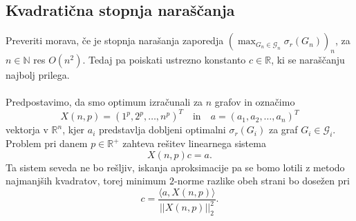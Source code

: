 \documentclass[ letterpaper, titlepage, fleqn]{article}
\begin{document}
\subsection{Kvadratična stopnja naraščanja}
Preveriti morava, če je stopnja narašanja zaporedja
$(\max_{G_n \in \mathscr{G}_n} \sigma_r(G_n))_n$, za $n \in \mathbb{N}$
res $O(n^2)$. Tedaj pa poiskati ustrezno konstanto $c \in \mathbb{R}$, ki 
se naraščanju najbolj prilega.
\\\\
Predpostavimo, da smo optimum izračunali za $n$ grafov in označimo 
$$X(n, p) = (1^p, 2^p, \dots, n^p)^T \quad \text{in}\quad a = (a_1, a_2, \dots, a_n)^T$$
vektorja v $\mathbb{R}^{n}$, kjer $a_i$ predstavlja
dobljeni optimalni $\sigma_r(G_i)$ za graf $G_i \in \mathscr{G}_i$.
Problem pri danem $p \in \mathbb{R}^{+}$ zahteva rešitev linearnega sistema 
$$X(n, p)c = a.$$
Ta sistem seveda ne bo rešljiv, iskanja aproksimacije pa se bomo
lotili z metodo najmanjših kvadratov, torej minimum $2$-norme
razlike obeh strani bo dosežen pri
$$c = \frac{\langle a, X(n, p)\rangle}{||X(n, p)||_{2}^2}.$$
\end{document}
